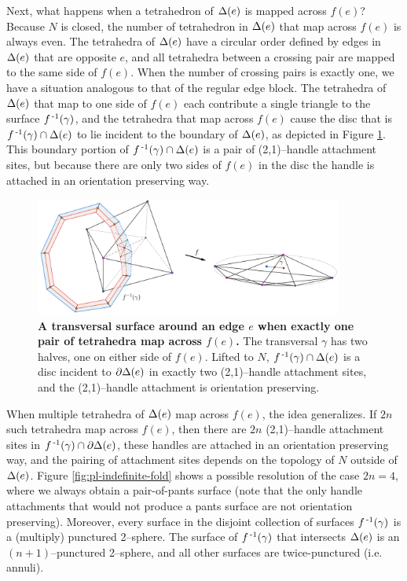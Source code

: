 Next, what happens when a tetrahedron of $\Delta(e)$ is mapped across $f(e)$?
Because $N$ is closed, the number of tetrahedron in $\Delta(e)$ that map across $f(e)$ is always even.
The tetrahedra of $\Delta(e)$ have a circular order defined by edges in $\Delta(e)$ that are opposite $e$, and all tetrahedra between a crossing pair are mapped to the same side of $f(e)$.
When the number of crossing pairs is exactly one, we have a situation analogous to that of the regular edge block.
The tetrahedra of $\Delta(e)$ that map to one side of $f(e)$ each contribute a single triangle to the surface $f^{\,\text{-}1}(\gamma)$, and the tetrahedra that map across $f(e)$ cause the disc that is $f^{\,\text{-}1}(\gamma)\cap\Delta(e)$ to lie incident to the boundary of $\Delta(e)$, as depicted in Figure \ref{fig:pl-regular-surface}.
This boundary portion of $f^{\,\text{-}1}(\gamma)\cap\Delta(e)$ is a pair of (2,1)--handle attachment sites, but because there are only two sides of $f(e)$ in the disc the handle is attached in an orientation preserving way.

\begin{figure}[h!]
	\centering
	\includegraphics[width=0.9\textwidth]{figures/pl-regular-surface.png}
	\caption{
		\textbf{A transversal surface around an edge $e$ when exactly one pair of tetrahedra map across $f(e)$.}
		The transversal $\gamma$ has two halves, one on either side of $f(e)$.
		Lifted to $N$, $f^{\,\text{-}1}(\gamma)\cap\Delta(e)$ is a disc incident to $\partial\Delta(e)$ in exactly two (2,1)--handle attachment sites, and the (2,1)--handle attachment is orientation preserving.
	}
	\label{fig:pl-regular-surface}
\end{figure}

When multiple tetrahedra of $\Delta(e)$ map across $f(e)$, the idea generalizes.
If $2n$ such tetrahedra map across $f(e)$, then there are $2n$ (2,1)--handle attachment sites in $f^{\,\text{-}1}(\gamma)\cap\partial\Delta(e)$, these handles are attached in an orientation preserving way, and the pairing of attachment sites depends on the topology of $N$ outside of $\Delta(e)$.
Figure \ref{fig:pl-indefinite-fold} shows a possible resolution of the case $2n=4$, where we always obtain a pair-of-pants surface (note that the only handle attachments that would not produce a pants surface are not orientation preserving).
Moreover, every surface in the disjoint collection of surfaces $f^{\,\text{-}1}(\gamma)$ is a (multiply) punctured 2--sphere.
The surface of $f^{\,\text{-}1}(\gamma)$ that intersects $\Delta(e)$ is an $(n+1)$--punctured 2--sphere, and all other surfaces are twice-punctured (i.e. annuli).


